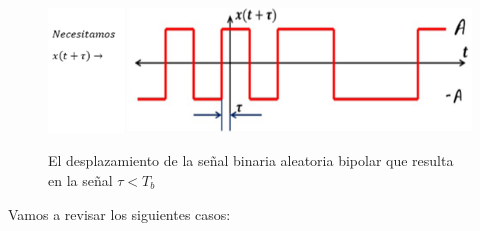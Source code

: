 \begin{figure}[h!]
	\captionsetup{justification = raggedright, singlelinecheck = false}
	\caption{El desplazamiento de la señal binaria aleatoria bipolar que resulta en la señal $\tau < T_b $} 
	\centering
	\includegraphics[scale=1]{Imagenes/Ejemplo1.png}
	\label{fig:Ejemplo1}
\end{figure}
Vamos a revisar los siguientes casos:
